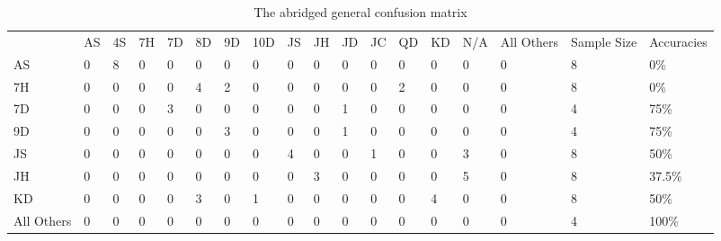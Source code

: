 \documentclass[a4paper,12pt,notitlepage]{article}
\begin{document}
	\pagebreak
	\begin{landscape}
		\begin{table}[t]
			\centering
			\caption{The abridged general confusion matrix}
			\label{tab:genconf}
			\begin{tabular}{| l || l | l | l | l | l | l | l | l | l | l | l | l | l | l | l || l | l |}
				\hline
				            & AS & 4S & 7H & 7D & 8D & 9D & 10D & JS & JH & JD & JC & QD & KD & N/A & All Others & Sample Size & Accuracies \\
				\hhline{|=|=|=|=|=|=|=|=|=|=|=|=|=|=|=|=|=|=|}
				AS          & 0  & 8\cellcolor[gray]{0.9}  & 0  & 0  & 0  & 0  & 0   & 0  & 0  & 0  & 0  & 0  & 0  & 0   & 0          & 8           &    0\%     \\
				\hline
				7H          & 0  & 0  & 0  & 0  & 4\cellcolor[gray]{0.9}  & 2\cellcolor[gray]{0.9}  & 0   & 0  & 0  & 0  & 0  & 2\cellcolor[gray]{0.9}  & 0  & 0   & 0          & 8           &    0\%     \\
				\hline
				7D          & 0  & 0  & 0  & 3\cellcolor[gray]{0.9}  & 0  & 0  & 0   & 0  & 0  & 1\cellcolor[gray]{0.9}  & 0  & 0  & 0  & 0   & 0          & 4           &   75\%     \\
				\hline
				9D          & 0  & 0  & 0  & 0  & 0  & 3\cellcolor[gray]{0.9}  & 0   & 0  & 0  & 1\cellcolor[gray]{0.9}  & 0  & 0  & 0  & 0   & 0          & 4           &   75\%     \\
				\hline
				JS          & 0  & 0  & 0  & 0  & 0  & 0  & 0   & 4\cellcolor[gray]{0.9}  & 0  & 0  & 1\cellcolor[gray]{0.9}  & 0  & 0  & 3\cellcolor[gray]{0.9}   & 0          & 8           &   50\%     \\
				\hline
				JH          & 0  & 0  & 0  & 0  & 0  & 0  & 0   & 0  & 3\cellcolor[gray]{0.9}  & 0  & 0  & 0  & 0  & 5\cellcolor[gray]{0.9}   & 0          & 8           & 37.5\%     \\
				\hline
				KD          & 0  & 0  & 0  & 0  & 3\cellcolor[gray]{0.9}  & 0  & 1\cellcolor[gray]{0.9}   & 0  & 0  & 0  & 0  & 0  & 4\cellcolor[gray]{0.9}  & 0   & 0          & 8           &   50\%     \\
				\hline
				All Others  & 0  & 0  & 0  & 0  & 0  & 0  & 0   & 0  & 0  & 0  & 0  & 0  & 0  & 0   & 0          & 4           &  100\%     \\
				\hline
			\end{tabular}
		\end{table}
	\end{landscape}
	\pagebreak
\pagebreak
\end{document}
